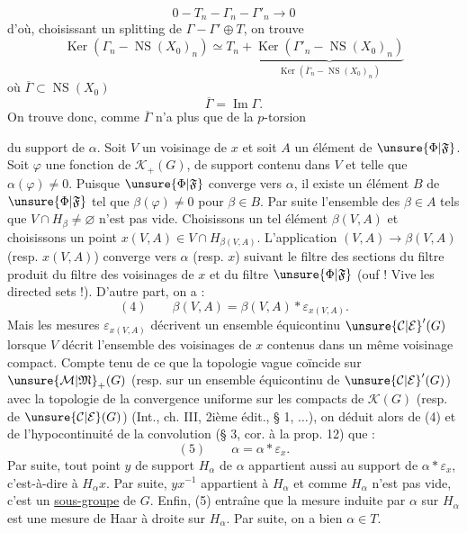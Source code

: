 \[
0\mathbin{-}T_n\mathbin{-}\Gamma_n\mathbin{-}\Gamma'_n\longrightarrow0
\]
d'où, choisissant un splitting de $\Gamma\mathbin{-}\Gamma'\oplus T$, on trouve
\[
\operatorname{Ker}(\Gamma_n\mathbin{-}\operatorname{NS}(X_0)_n)\simeq T_n+\underbrace{\operatorname{Ker}(\Gamma'_n\mathbin{-}\operatorname{NS}(X_0)_n)}_{\operatorname{Ker}(\overline\Gamma_n\mathbin{-}\operatorname{NS}(X_0)_n)}
\]
où $\overline\Gamma\subset\operatorname{NS}(X_0)$
\[
\overline\Gamma=\operatorname{Im}\Gamma.
\]
On trouve donc, comme $\overline\Gamma$ n'a plus que de la $p$-torsion

du support de $\alpha$. Soit $V$ un voisinage de $x$ et soit $A$ un élément de $\unsure{\Phi|\mathfrak F}$. Soit $\varphi$ une fonction de $\mathcal K_+(G)$, de support contenu dans $V$ et telle que $\alpha(\varphi)\ne 0$. Puisque $\unsure{\Phi|\mathfrak F}$ converge vers $\alpha$, il existe un élément $B$ de $\unsure{\Phi|\mathfrak F}$ tel que $\beta(\varphi)\ne 0$ pour $\beta\in B$. Par suite l'ensemble des $\beta\in A$ tels que $V\cap H_\beta\ne\varnothing$ n'est pas vide. Choisissons un tel élément $\beta(V,A)$ et choisissons un point $x(V,A)\in V\cap H_{\beta(V,A)}$. L'application $(V,A)\longrightarrow\beta(V,A)$ (resp. $x(V,A)$) converge vers $\alpha$ (resp. $x$) suivant le filtre des sections du filtre produit du filtre des voisinages de $x$ et du filtre $\unsure{\Phi|\mathfrak F}$ (ouf ! Vive les directed sets !). D'autre part, on a :
\[
(4)\qquad\beta(V,A)=\beta(V,A)*\varepsilon_{x(V,A)}.
\]
Mais les mesures $\varepsilon_{x(V,A)}$ décrivent un ensemble équicontinu $\unsure{\mathcal C|\mathcal E}'(G)$ lorsque $V$ décrit l'ensemble des voisinages de $x$ contenus dans un même voisinage compact. Compte tenu de ce que la topologie vague coïncide sur $\unsure{\mathcal M|\mathfrak M}_+(G)$ (resp. sur un ensemble équicontinu de $\unsure{\mathcal C|\mathcal E}'(G)$) avec la topologie de la convergence uniforme sur les compacts de $\mathcal K(G)$ (resp. de $\unsure{\mathcal C|\mathcal E}(G)$) (Int., ch. III, 2ième édit., § 1, $\ldots$), on déduit alors de (4) et de l'hypocontinuité de la convolution (§ 3, cor. à la prop. 12) que :
\[
(5)\qquad\alpha=\alpha*\varepsilon_x.
\]
Par suite, tout point $y$ de support $H_\alpha$ de $\alpha$ appartient aussi au support de $\alpha*\varepsilon_x$, c'est-à-dire à $H_\alpha x$. Par suite, $yx^{-1}$ appartient à $H_\alpha$ et comme $H_\alpha$ n'est pas vide, c'est un \uline{sous-groupe} de $G$. Enfin, (5) entraîne que la mesure induite par $\alpha$ sur $H_\alpha$ est une mesure de Haar à droite sur $H_\alpha$. Par suite, on a bien $\alpha\in T$.

